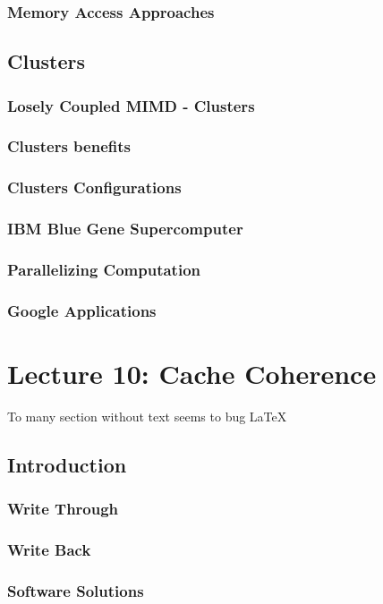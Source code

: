 \documentclass[titlepage, a4paper]{article}
\begin{document}
\subsubsection{Memory Access Approaches}
\subsection{Clusters}
\subsubsection{Losely Coupled MIMD - Clusters}
\subsubsection{Clusters benefits}
\subsubsection{Clusters Configurations}
\subsubsection{IBM Blue Gene Supercomputer}
\subsubsection{Parallelizing Computation}
\subsubsection{Google Applications}

\section{Lecture 10: Cache Coherence}
To many section without text seems to bug \LaTeX
\subsection{Introduction}
\subsubsection{Write Through}
\subsubsection{Write Back}
\subsubsection{Software Solutions}
\end{document}
